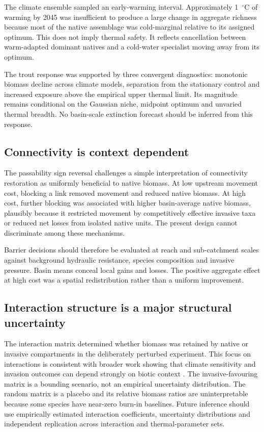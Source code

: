 \documentclass[11pt,a4paper]{article}
\begin{document}
The climate ensemble sampled an early-warming interval. Approximately 1~$^\circ$C of warming by 2045 was insufficient to produce a large change in aggregate richness because most of the native assemblage was cold-marginal relative to its assigned optimum. This does not imply thermal safety. It reflects cancellation between warm-adapted dominant natives and a cold-water specialist moving away from its optimum.

The trout response was supported by three convergent diagnostics: monotonic biomass decline across climate models, separation from the stationary control and increased exposure above the empirical upper thermal limit. Its magnitude remains conditional on the Gaussian niche, midpoint optimum and unvaried thermal breadth. No basin-scale extinction forecast should be inferred from this response.

\subsection{Connectivity is context dependent}

The passability sign reversal challenges a simple interpretation of connectivity restoration as uniformly beneficial to native biomass. At low upstream movement cost, blocking a link removed movement and reduced native biomass. At high cost, further blocking was associated with higher basin-average native biomass, plausibly because it restricted movement by competitively effective invasive taxa or reduced net losses from isolated native units. The present design cannot discriminate among these mechanisms.

Barrier decisions should therefore be evaluated at reach and sub-catchment scales against background hydraulic resistance, species composition and invasive pressure. Basin means conceal local gains and losses. The positive aggregate effect at high cost was a spatial redistribution rather than a uniform improvement.

\subsection{Interaction structure is a major structural uncertainty}

The interaction matrix determined whether biomass was retained by native or invasive compartments in the deliberately perturbed experiment. This focus on interactions is consistent with broader work showing that climate sensitivity and invasion outcomes can depend strongly on biotic context \cite{Carosietal2023}. The invasive-favouring matrix is a bounding scenario, not an empirical uncertainty distribution. The random matrix is a placebo and its relative biomass ratios are uninterpretable because some species have near-zero burn-in baselines. Future inference should use empirically estimated interaction coefficients, uncertainty distributions and independent replication across interaction and thermal-parameter sets.
\end{document}

